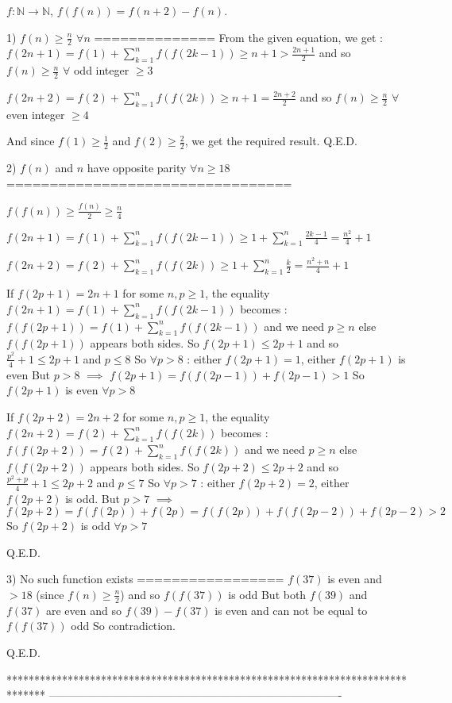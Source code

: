 \begin{solution}
	\begin{tcolorbox}$f : \mathbb{N} \rightarrow \mathbb{N}$, $f(f(n))=f(n+2)-f(n)$.\end{tcolorbox}
1) $f(n)\ge\frac n2$ $\forall n$
==============
From the given equation, we get :
$f(2n+1)=f(1)+\sum_{k=1}^n f(f(2k-1))\ge n+1>\frac{2n+1}2$ and so $f(n)\ge\frac n2$ $\forall$ odd integer $\ge 3$

$f(2n+2)=f(2)+\sum_{k=1}^nf(f(2k))\ge n+1=\frac{2n+2}2$ and so $f(n)\ge\frac n2$ $\forall$ even integer $\ge 4$

And since $f(1)\ge \frac 12$ and $f(2)\ge \frac 22$, we get the required result.
Q.E.D.

2) $f(n)$ and $n$ have opposite parity $\forall n\ge 18$
=================================

$f(f(n))\ge\frac{f(n)}2\ge \frac n4$

$f(2n+1)=f(1)+\sum_{k=1}^n f(f(2k-1))\ge 1+\sum_{k=1}^n \frac{2k-1}4=\frac{n^2}4+1$

$f(2n+2)=f(2)+\sum_{k=1}^nf(f(2k))\ge 1+\sum_{k=1}^n \frac k2=\frac{n^2+n}4+1$

If $f(2p+1)=2n+1$ for some $n,p\ge 1$, the equality $f(2n+1)=f(1)+\sum_{k=1}^n f(f(2k-1))$ becomes :
$f(f(2p+1))=f(1)+\sum_{k=1}^n f(f(2k-1))$ and we need $p\ge n$ else $f(f(2p+1))$ appears both sides.
So $f(2p+1)\le 2p+1$ and so $\frac{p^2}4+1\le 2p+1$ and $p\le 8$
So $\forall p>8$ : either $f(2p+1)=1$, either $f(2p+1)$ is even
But $p>8$ $\implies$ $f(2p+1)=f(f(2p-1))+f(2p-1)>1$
So $f(2p+1)$ is even $\forall p>8$

If $f(2p+2)=2n+2$ for some $n,p\ge 1$, the equality $f(2n+2)=f(2)+\sum_{k=1}^nf(f(2k))$ becomes :
$f(f(2p+2))=f(2)+\sum_{k=1}^nf(f(2k))$ and we need $p\ge n$ else $f(f(2p+2))$ appears both sides.
So $f(2p+2)\le 2p+2$ and so $\frac{p^2+p}4+1\le 2p+2$ and $p\le 7$
So $\forall p>7$ : either $f(2p+2)=2$, either $f(2p+2)$ is odd.
But $p>7$ $\implies$ $f(2p+2)=f(f(2p))+f(2p)=f(f(2p))+f(f(2p-2))+f(2p-2)>2$
So $f(2p+2)$ is odd $\forall p>7$

Q.E.D.

3) No such function exists
=================
$f(37)$ is even and $>18$ (since $f(n)\ge \frac n2$) and so $f(f(37))$ is odd
But both $f(39)$ and $f(37)$ are even and so $f(39)-f(37)$ is even and can not be equal to $f(f(37))$ odd
So contradiction.

Q.E.D.
\end{solution}
*******************************************************************************
-------------------------------------------------------------------------------

